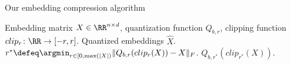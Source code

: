 \begin{algorithm}[tb]
   \caption{Our embedding compression algorithm}
   \label{alg:smallfry}
\begin{algorithmic}[1]
	  Embedding matrix $X \in \RR^{n \times d}$, quantization function $Q_{b,r}$, clipping function $clip_r\colon\RR\rightarrow[-r,r]$.
	 Quantized embeddings $\hat{X}$.
	\STATE $r^* \defeq \argmin_{r \in [0,\max(|X|)} \|Q_{b,r}(clip_r(X))-X\|_F$.
	 $Q_{b,r^*}(clip_{r^*}(X))$.
\end{algorithmic}
\end{algorithm}

